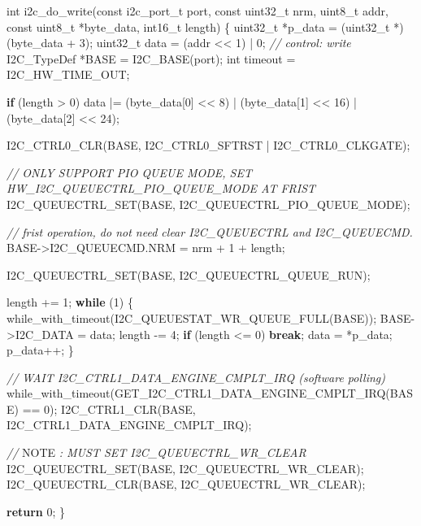 \documentclass[
  12pt,
]{book}
\newenvironment{Shaded}{\begin{snugshade}}{\end{snugshade}}
\newcommand{\AlertTok}[1]{\textcolor[rgb]{0.94,0.16,0.16}{#1}}
\newcommand{\CommentTok}[1]{\textcolor[rgb]{0.56,0.35,0.01}{\textit{#1}}}
\newcommand{\ControlFlowTok}[1]{\textcolor[rgb]{0.13,0.29,0.53}{\textbf{#1}}}
\newcommand{\DataTypeTok}[1]{\textcolor[rgb]{0.13,0.29,0.53}{#1}}
\newcommand{\DecValTok}[1]{\textcolor[rgb]{0.00,0.00,0.81}{#1}}
\newcommand{\NormalTok}[1]{#1}
\begin{document}
\begin{Shaded}
\begin{Highlighting}[]
\DataTypeTok{int}\NormalTok{ i2c_do_write(}\DataTypeTok{const}\NormalTok{ i2c_port_t port, }\DataTypeTok{const} \DataTypeTok{uint32_t}\NormalTok{ nrm, }\DataTypeTok{uint8_t}\NormalTok{ addr, }\DataTypeTok{const} \DataTypeTok{uint8_t}\NormalTok{ *byte_data, }\DataTypeTok{int16_t}\NormalTok{ length)}
\NormalTok{\{}
    \DataTypeTok{uint32_t}\NormalTok{ *p_data = (}\DataTypeTok{uint32_t}\NormalTok{ *)(byte_data + }\DecValTok{3}\NormalTok{);}
    \DataTypeTok{uint32_t}\NormalTok{ data = (addr <<  }\DecValTok{1}\NormalTok{) | }\DecValTok{0}\NormalTok{;     }\CommentTok{// control: write}
\NormalTok{    I2C_TypeDef *BASE = I2C_BASE(port);}
    \DataTypeTok{int}\NormalTok{ timeout = I2C_HW_TIME_OUT;}

    \ControlFlowTok{if}\NormalTok{ (length > }\DecValTok{0}\NormalTok{)}
\NormalTok{        data |= (byte_data[}\DecValTok{0}\NormalTok{] <<  }\DecValTok{8}\NormalTok{) | (byte_data[}\DecValTok{1}\NormalTok{] << }\DecValTok{16}\NormalTok{) | (byte_data[}\DecValTok{2}\NormalTok{] << }\DecValTok{24}\NormalTok{);}

\NormalTok{    I2C_CTRL0_CLR(BASE, I2C_CTRL0_SFTRST | I2C_CTRL0_CLKGATE);}

    \CommentTok{// ONLY SUPPORT PIO QUEUE MODE, SET HW_I2C_QUEUECTRL_PIO_QUEUE_MODE AT FRIST}
\NormalTok{    I2C_QUEUECTRL_SET(BASE, I2C_QUEUECTRL_PIO_QUEUE_MODE);}

    \CommentTok{// frist operation, do not need clear I2C_QUEUECTRL and I2C_QUEUECMD.}
\NormalTok{    BASE->I2C_QUEUECMD.NRM = nrm + }\DecValTok{1}\NormalTok{ + length;}

\NormalTok{    I2C_QUEUECTRL_SET(BASE, I2C_QUEUECTRL_QUEUE_RUN);}


\NormalTok{    length += }\DecValTok{1}\NormalTok{;}
    \ControlFlowTok{while}\NormalTok{ (}\DecValTok{1}\NormalTok{)}
\NormalTok{    \{}
\NormalTok{        while_with_timeout(I2C_QUEUESTAT_WR_QUEUE_FULL(BASE));}
\NormalTok{        BASE->I2C_DATA = data;}
\NormalTok{        length -= }\DecValTok{4}\NormalTok{;}
        \ControlFlowTok{if}\NormalTok{ (length <= }\DecValTok{0}\NormalTok{)}
            \ControlFlowTok{break}\NormalTok{;}
\NormalTok{        data = *p_data;}
\NormalTok{        p_data++;}
\NormalTok{    \}}

    \CommentTok{// WAIT I2C_CTRL1_DATA_ENGINE_CMPLT_IRQ (software polling)}
\NormalTok{    while_with_timeout(GET_I2C_CTRL1_DATA_ENGINE_CMPLT_IRQ(BASE) == }\DecValTok{0}\NormalTok{);}
\NormalTok{    I2C_CTRL1_CLR(BASE, I2C_CTRL1_DATA_ENGINE_CMPLT_IRQ);}

    \CommentTok{// }\AlertTok{NOTE}\CommentTok{ : MUST SET I2C_QUEUECTRL_WR_CLEAR}
\NormalTok{    I2C_QUEUECTRL_SET(BASE, I2C_QUEUECTRL_WR_CLEAR);}
\NormalTok{    I2C_QUEUECTRL_CLR(BASE, I2C_QUEUECTRL_WR_CLEAR);}

    \ControlFlowTok{return} \DecValTok{0}\NormalTok{;}
\NormalTok{\}}
\end{Highlighting}
\end{Shaded}
\end{document}
